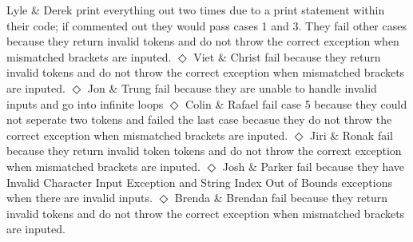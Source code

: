 \documentclass[12pt]{article}
\begin{document}
\begin{table}[H]
	\centering
\end{table}
Lyle \& Derek print everything out two times due to a print statement within their code; if
commented out they would pass cases 1 and 3. They fail other cases because they return invalid
tokens and do not throw the correct exception when mismatched brackets are inputed.
$\Diamond$ Viet \& Christ fail because they return invalid tokens and do not throw the correct exception
when mismatched brackets are inputed.
$\Diamond$ Jon \& Trung fail because they are unable to handle invalid inputs and go into infinite loops
$\Diamond$ Colin \& Rafael fail case 5 because they could not seperate two tokens and failed the last case
becasue they do not throw the correct exception when mismatched brackets are inputed.
$\Diamond$ Jiri \& Ronak fail because they return invalid token tokens and do not throw the corrext exception
when mismatched brackets are inputed.
$\Diamond$ Josh \& Parker fail because they have Invalid Character Input Exception and String Index Out of
Bounds exceptions when there are invalid inputs.
$\Diamond$ Brenda \& Brendan fail because they return invalid tokens and do not throw the correct exception
when mismatched brackets are inputed.
\end{document}
